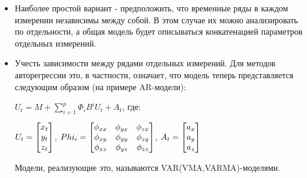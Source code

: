\begin{itemize}
\item Наиболее простой вариант - предположить, что временные ряды в каждом измерении независимы между собой. В этом случае их можно анализировать по отдельности, а общая модель будет описываться конкатенацией параметров отдельных измерений.
\item Учесть зависимости между рядами отдельных измерений. Для методов авторегрессии это, в частности, означает, что модель теперь представляется следующим образом (на примере AR-модели):

$U_t=M+\sum_{i=1}^p \Phi_iB^i U_t + A_t$,  где:

 $U_t=\begin{bmatrix} x_t \\ y_t \\ z_t \\ \end{bmatrix}$, $Phi_i=\begin{bmatrix} \phi_{xx} & \phi_{yx} & \phi_{zx} \\ \phi_{xy} & \phi_{yy} & \phi_{zy} \\ \phi_{xz} & \phi_{yz} & \phi_{zz} \\ \end{bmatrix}$, 
 $A_t=\begin{bmatrix} a_x \\ a_y \\ a_z \\ \end{bmatrix}$

Модели, реализующие это, называются VAR(VMA,VARMA)-моделями. 
\end{itemize}